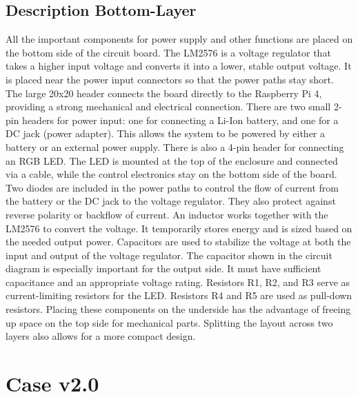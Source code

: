 \subsection*{Description Bottom-Layer}
All the important components for power supply and other functions are placed on the bottom side of the circuit board.
The LM2576 is a voltage regulator that takes a higher input voltage and converts it into a lower, stable output voltage. It is placed near the power input connectors so that the power paths stay short. The large 20x20 header connects the board directly to the Raspberry Pi 4, providing a strong mechanical and electrical connection.
There are two small 2-pin headers for power input: one for connecting a Li-Ion battery, and one for a DC jack (power adapter). This allows the system to be powered by either a battery or an external power supply. There is also a 4-pin header for connecting an RGB LED. The LED is mounted at the top of the enclosure and connected via a cable, while the control electronics stay on the bottom side of the board.
Two diodes are included in the power paths to control the flow of current from the battery or the DC jack to the voltage regulator. They also protect against reverse polarity or backflow of current. An inductor works together with the LM2576 to convert the voltage. It temporarily stores energy and is sized based on the needed output power.
Capacitors are used to stabilize the voltage at both the input and output of the voltage regulator. The capacitor shown in the circuit diagram is especially important for the output side. It must have sufficient capacitance and an appropriate voltage rating. Resistors R1, R2, and R3 serve as current-limiting resistors for the LED. Resistors R4 and R5 are used as pull-down resistors.
Placing these components on the underside has the advantage of freeing up space on the top side for mechanical parts. Splitting the layout across two layers also allows for a more compact design.


\section{Case v2.0}

